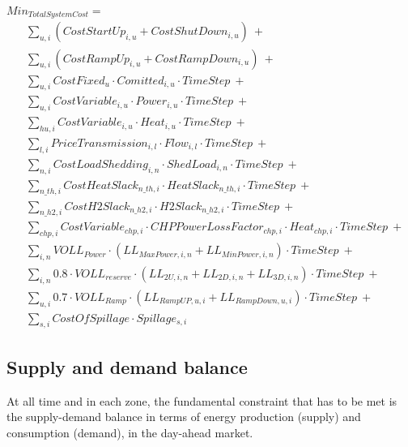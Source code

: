 \begin{captionnable}
    $Min_{TotalSystemCost}=$
    \begin{equation}
        \begin{split}
            & \sum_{u,i} (CostStartUp_{i,u} + CostShutDown_{i,u}) \:+ \\
            & \sum_{u,i} (CostRampUp_{i,u} +CostRampDown_{i,u}) \:+ \\
            & \sum_{u,i} CostFixed_{u}\cdot Comitted_{i,u} \cdot TimeStep\:+ \\
            & \sum_{u,i} CostVariable_{i,u}\cdot  Power_{i,u} \cdot TimeStep\:+ \\
            & \sum_{hu,i} CostVariable_{i,u}\cdot Heat_{i,u} \cdot TimeStep \:+ \\
            & \sum_{l,i} PriceTransmission_{i,l}\cdot Flow_{i,l} \cdot TimeStep \:+ \\  
            & \sum_{n,i} CostLoadShedding_{i,n}\cdot ShedLoad_{i,n} \cdot TimeStep \:+ \\
            & \sum_{n\_th,i} CostHeatSlack_{n\_th,i}\cdot HeatSlack_{n\_th,i} \cdot TimeStep \:+ \\ 
            & \sum_{n\_h2,i} CostH2Slack_{n\_h2,i}\cdot H2Slack_{n\_h2,i} \cdot TimeStep \:+ \\ 
            & \sum_{chp,i} CostVariable_{chp,i}\cdot CHPPowerLossFactor_{chp,i}\cdot Heat_{chp,i} \cdot TimeStep \:+  \\
            & \sum_{i,n} VOLL_{Power}·(LL_{MaxPower,i,n} +LL_{MinPower,i,n}) \cdot TimeStep \:+  \\
            & \sum_{i,n} 0.8 \cdot VOLL_{reserve}·(LL_{2U,i,n} + LL_{2D,i,n} + LL_{3D,i,n}) \cdot TimeStep \:+ \\
            & \sum_{u,i} 0.7 \cdot VOLL_{Ramp}·(LL_{RampUP,u,i} +LL_{RampDown,u,i}) \cdot TimeStep \:+\\
            & \sum_{s,i}CostOfSpillage \cdot Spillage_{s,i}
        \end{split}
        \label{obj-function-sum}
    \end{equation}
\end{captionnable}

\subsection{Supply and demand balance}

At all time and in each zone, the fundamental constraint that has to be met is the supply-demand balance in terms of energy production (supply) and consumption (demand), in the day-ahead market.

